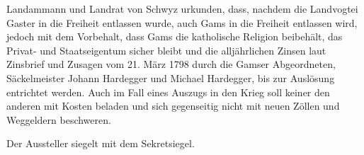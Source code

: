 \documentclass[10pt,twoside]{article}
\begin{document}
\def\volume{XIV. Abteilung: Die Rechtsquellen des Kantons St. Gallen, Dritter Teil: Die Landschaften und Landstädte, Band 4: Die Rechtsquellen der
     Region Werdenberg: Grafschaft Werdenberg und Herrschaft Wartau, Freiherrschaft Sax-Forstegg und Herrschaft Hohensax-Gams von Sibylle Malamud, 2019.}
\def\volid{\url{https://www.ssrq-sds-fds.ch/online/tei/SG/SSRQ_SG_III_4_259.xml}}
\linenumbers				%
\normalsize					%
\thispagestyle{firstpage}
\sloppy
\setcounter{subsection}{258}  %
\fussy
{}
\begin{summary}
Landammann und Landrat von Schwyz urkunden, dass, nachdem die Landvogtei Gaster in die Freiheit
                        entlassen wurde, auch Gams in die Freiheit entlassen wird, jedoch mit dem
                        Vorbehalt, dass Gams die katholische Religion beibehält, das Privat- und
                        Staatseigentum sicher bleibt und die alljährlichen Zinsen laut Zinsbrief und
                        Zusagen vom 21. März 1798 durch die Gamser Abgeordneten, Säckelmeister
                        Johann Hardegger und Michael Hardegger, bis zur Auslösung entrichtet werden.
                        Auch im Fall eines Auszugs in den Krieg soll keiner den anderen mit Kosten
                        beladen und sich gegenseitig nicht mit neuen Zöllen und Weggeldern
                        beschweren.

 Der Aussteller siegelt mit dem
   Sekretsiegel.


\end{summary}
\end{document}

